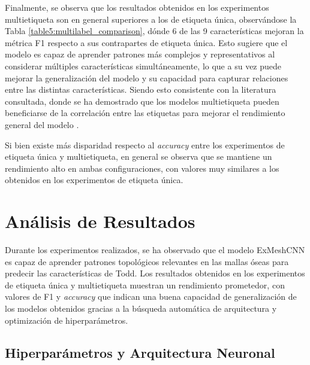 Finalmente, se observa que los resultados obtenidos en los experimentos multietiqueta son en general superiores a los de etiqueta única, observándose la Tabla \ref{table5:multilabel_comparison}, dónde 6 de las 9 características mejoran la métrica F1 respecto a sus contrapartes de etiqueta única. Esto sugiere que el modelo es capaz de aprender patrones más complejos y representativos al considerar múltiples características simultáneamente, lo que a su vez puede mejorar la generalización del modelo y su capacidad para capturar relaciones entre las distintas características. Siendo esto consistente con la literatura consultada, donde se ha demostrado que los modelos multietiqueta pueden beneficiarse de la correlación entre las etiquetas para mejorar el rendimiento general del modelo \cite{ranjan_hyperface_2019}.

Si bien existe más disparidad respecto al \textit{accuracy} entre los experimentos de etiqueta única y multietiqueta, en general se observa que se mantiene un rendimiento alto en ambas configuraciones, con valores muy similares a los obtenidos en los experimentos de etiqueta única.

\section{Análisis de Resultados}
Durante los experimentos realizados, se ha observado que el modelo ExMeshCNN es capaz de aprender patrones topológicos relevantes en las mallas óseas para predecir las características de Todd. Los resultados obtenidos en los experimentos de etiqueta única y multietiqueta muestran un rendimiento prometedor, con valores de F1 y \textit{accuracy} que indican una buena capacidad de generalización de los modelos obtenidos gracias a la búsqueda automática de arquitectura y optimización de hiperparámetros.

\subsection{Hiperparámetros y Arquitectura Neuronal}

